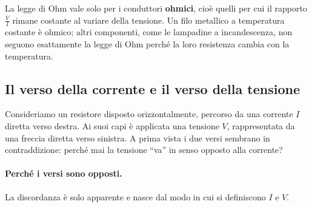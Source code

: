 \begin{attenzione}
La legge di Ohm vale solo per i conduttori \textbf{ohmici}, cioè quelli per cui il rapporto \(\frac{V}{I}\) rimane costante al variare della tensione. Un filo metallico a temperatura costante è ohmico; altri componenti, come le lampadine a incandescenza, non seguono esattamente la legge di Ohm perché la loro resistenza cambia con la temperatura.
\end{attenzione}




\subsection{Il verso della corrente e il verso della tensione}

Consideriamo un resistore disposto orizzontalmente, percorso da una corrente \(I\) diretta verso destra. Ai suoi capi è applicata una tensione \(V\), rappresentata da una freccia diretta verso sinistra. A prima vista i due versi sembrano in contraddizione: perché mai la tensione “va” in senso opposto alla corrente?

\begin{figure}[htbp]
\centering
{}
\end{figure}

\paragraph{Perché i versi sono opposti.}
La discordanza è solo apparente e nasce dal modo in cui si definiscono \(I\) e \(V\).

